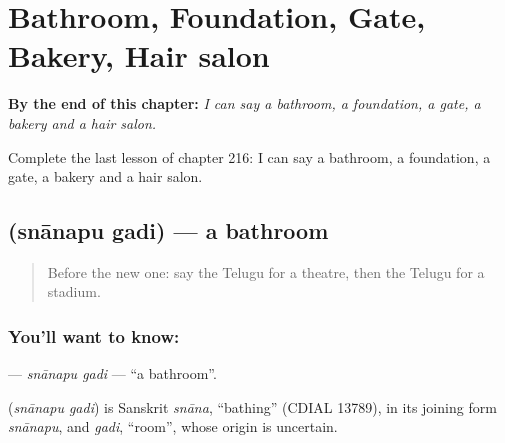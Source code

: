 
\chapter{Bathroom, Foundation, Gate, Bakery, Hair salon}
\label{ch:te-bathroom-foundation-gate-bakery-hair-salon}

\begin{chapteropening}
\textbf{By the end of this chapter:} \emph{I can say a bathroom, a foundation, a gate, a bakery and a hair salon.}

Complete the last lesson of chapter 216: I can say a bathroom, a foundation, a gate, a bakery and a hair salon.
\end{chapteropening}

\section[\texorpdfstring{\te{స్నానపు} \te{గది} (snānapu gadi)}{స్నానపు గది (snānapu gadi)}]{  (snānapu gadi) — a bathroom}

\label{lesson:TE-C216-snanapu-gadi}



\begin{quote}
Before the new one: say the Telugu for a theatre, then the Telugu for a stadium.
\end{quote}

\subsection*{You'll want to know:  }
\textbf{ } — \emph{snānapu gadi} — \textquotedblleft{}a bathroom\textquotedblright{}.

\begin{cousinweb}
\textbf{ } (\emph{snānapu gadi}) is Sanskrit \emph{snāna}, \textquotedblleft{}bathing\textquotedblright{} (CDIAL 13789), in its joining form \emph{snānapu}, and \emph{gadi}, \textquotedblleft{}room\textquotedblright{}, whose origin is uncertain.
\end{cousinweb}

